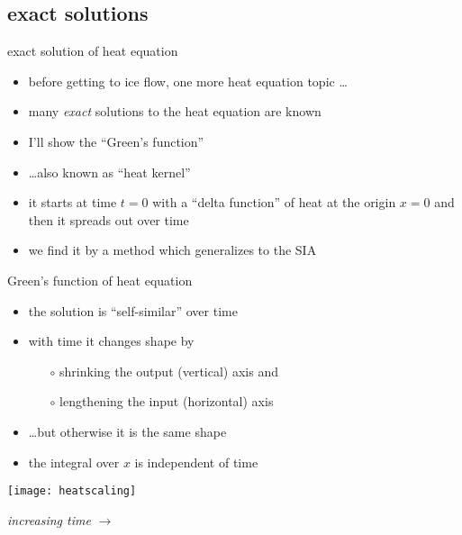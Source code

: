\subsection{exact solutions}

\begin{frame}{exact solution of heat equation}

\begin{itemize}
\item before getting to ice flow, one more heat equation topic \dots
\vspace{5mm}

\item many \emph{exact} solutions to the heat equation are known
\item I'll show the ``Green's function''
\item \dots also known as ``heat kernel''
\item it starts at time $t=0$ with a ``delta function'' of heat at the origin $x=0$ and then it spreads out over time
\item we find it by a method which generalizes to the SIA
\end{itemize}
\end{frame}


\begin{frame}{Green's function of heat equation}

\begin{itemize}
\item the solution is ``self-similar'' over time
\item with time it changes shape by
  \begin{itemize}
  \item[$\circ$] shrinking the output (vertical) axis and
  \item[$\circ$] lengthening the input (horizontal) axis
  \end{itemize}
\item \dots but otherwise it is the same shape
\item the integral over $x$ is independent of time
\end{itemize}

\begin{center}
\texttt{[image: heatscaling]}

\emph{increasing time} \Large $\to$
\end{center}
\end{frame}


